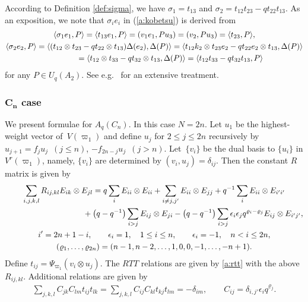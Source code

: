 \documentclass[pdftex]{sigma}
\begin{document}
According to Def\/inition \ref{def:sigma}, we have
$\sigma_1 = t_{13}$ and $\sigma_2 = t_{12}t_{23}-qt_{22}t_{13}$.
As an exposition,  we note that
$\sigma_i e_i$ in (\ref{a:kobetsu}) is  derived from
\begin{gather*}
\langle \sigma_1e_1, P\rangle  =\langle t_{13}e_1, P\rangle
= (v_1e_1, Pu_3) = (v_2, Pu_3) = \langle t_{23}, P \rangle,\\
\langle \sigma_2e_2, P\rangle
= \langle (t_{12}\otimes t_{23}-qt_{22}\otimes t_{13})\Delta(e_2), \Delta(P)\rangle
=\langle t_{12}k_2 \otimes t_{23}e_2- q t_{22}e_2\otimes t_{13}, \Delta(P)\rangle\\
\hphantom{\langle \sigma_2e_2, P\rangle}{}
= \langle t_{12} \otimes t_{33}- q t_{32}\otimes t_{13}, \Delta(P)\rangle
= \langle t_{12}t_{33}- q t_{32} t_{13}, P\rangle
\end{gather*}
for any $P \in U_q(A_2)$.
See e.g.~\cite{NYM} for an extensive treatment.

\subsubsection[$C_n$ case]{$\boldsymbol{C_n}$ case}\label{a:sss:c1}

We present formulae for $A_q(C_n)$. In this case $N=2n$.
Let $u_1$ be the highest-weight vector of~$V(\varpi_1)$ and
def\/ine $u_j$ for $2\le j\le 2n$ recursively by $u_{j+1}=f_ju_j$~$(j\le n)$, $-f_{2n-j}u_j$~$(j>n)$.
Let~$\{v_i\}$ be the dual basis to $\{u_i\}$ in $V^r(\varpi_1)$,
namely, $\{v_i\}$ are determined
by $(v_i,u_j)=\delta_{ij}$. Then the constant $R$ matrix is given by
\begin{gather*}
 \sum_{i,j,k,l}R_{ij,kl}E_{ik}\otimes E_{jl}=
q\sum_i E_{ii}\otimes E_{ii} + \sum_{i\neq j, j'}E_{ii}\otimes E_{jj}
+q^{-1}\sum_i E_{ii}\otimes E_{i'i'}\\
\hphantom{\sum_{i,j,k,l}R_{ij,kl}E_{ik}\otimes E_{jl}=}{}
+\big(q-q^{-1}\big)\sum_{i>j}E_{ij}\otimes E_{ji}
-\big(q-q^{-1}\big)\sum_{i>j}\epsilon_i\epsilon_jq^{\varrho_i-\varrho_j}E_{ij}\otimes E_{i'j'},\\
i' = 2n+1-i,
\qquad
\epsilon_i = 1, \quad 1\le i \le n,\qquad \epsilon_i = -1, \quad n<i \le 2n,\\
(\varrho_1,\ldots, \varrho_{2n}) = (n-1,n-2,\ldots,1,0,0,-1,\ldots, -n+1).
\end{gather*}
Def\/ine $t_{ij}=\Psi_{\varpi_1}(v_i \otimes u_j)$. The $RTT$ relations are given by \eqref{a:rtt}
with the above $R_{ij,kl}$. Additional relations are given by
\begin{gather*}
 \sum_{j,k,l}C_{jk}C_{lm}t_{ij}t_{lk}
= \sum_{j,k,l}C_{ij}C_{kl}t_{kj}t_{lm} = -\delta_{im},
\qquad  C_{ij}= \delta_{i,j'}\epsilon_i q^{\varrho_j}.
\end{gather*}
\end{document}

